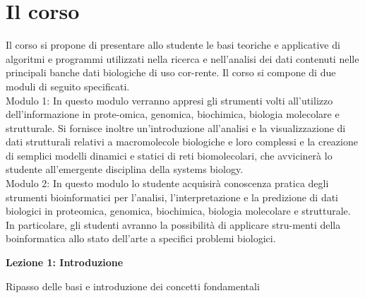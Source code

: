 \documentclass{article}
\begin{document}
\section{Il corso}
Il corso si propone di presentare allo studente le basi teoriche e applicative di algoritmi e programmi utilizzati nella ricerca e nell'analisi dei dati contenuti nelle principali banche dati biologiche di uso cor-rente. Il corso si compone di due moduli di seguito specificati.\\
Modulo 1: In questo modulo verranno appresi gli strumenti volti all'utilizzo dell'informazione in prote-omica, genomica, biochimica, biologia molecolare e strutturale. Si fornisce inoltre un'introduzione all'analisi e la visualizzazione di dati strutturali relativi a macromolecole biologiche e loro complessi e la creazione di semplici modelli dinamici e statici di reti biomolecolari, che avvicinerà lo studente all'emergente disciplina della systems biology.\\
Modulo 2: In questo modulo lo studente acquisirà conoscenza pratica degli strumenti bioinformatici per l'analisi, l'interpretazione e la predizione di dati biologici in proteomica, genomica, biochimica, biologia molecolare e strutturale. 
In particolare, gli studenti avranno la possibilità di applicare stru-menti della boinformatica allo stato dell'arte a specifici problemi biologici.
\begin{titlepage}
    \begin{center}
        \vspace*{1cm}
        \LARGE
        \textbf{Lezione 1: Introduzione}
            
        \vspace{1.5cm}
        
        \large
        Ripasso delle basi e introduzione dei concetti fondamentali

        \vspace{0.8cm}

    \end{center}
\end{titlepage}
\setcounter{page}{5}
\end{document}

